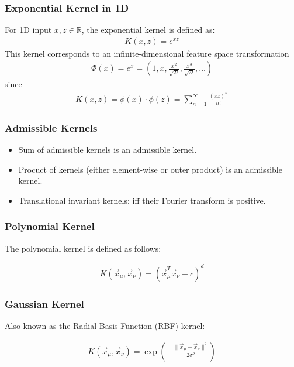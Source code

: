 \documentclass[11pt]{book} %
\begin{document}
\subsubsection{Exponential Kernel in 1D}
For 1D input $x, z \in \mathbb{R}$, the exponential kernel is defined as:
\begin{align*}
    K(x, z) = e^{xz}
\end{align*}
This kernel corresponds to an infinite-dimensional feature space transformation
\begin{align*}
    \Phi(x) = e^x = (1, x, \frac{x^2}{\sqrt{2!}}, \frac{x^3}{\sqrt{3!}}, \ldots)
\end{align*}
since
\begin{align*}
    K(x,z) = \phi(x) \cdot \phi(z) = \sum_{n=1}^{\infty} \frac{(xz)^n}{n!}
\end{align*}

\subsubsection{Admissible Kernels}
\begin {itemize}
    \item Sum of admissible kernels is an admissible kernel.
    \item Procuct of kernels (either element-wise or outer product) is an admissible kernel.
    \item Translational invariant kernels: iff their Fourier transform is positive.
\end {itemize}

\subsubsection{Polynomial Kernel}
The polynomial kernel is defined as follows:

\begin{align*}
    K(\vec{x}_\mu, \vec{x}_\nu) = (\vec{x}_\mu^T \vec{x}_\nu + c)^d
\end{align*}

\subsubsection{Gaussian Kernel}
Also known as the Radial Basis Function (RBF) kernel:

\begin{align*}
    K(\vec{x}_\mu, \vec{x}_\nu) = \exp\left(-\frac{\|\vec{x}_\mu - \vec{x}_\nu\|^2}{2\sigma^2}\right)
\end{align*}
\end{document}
